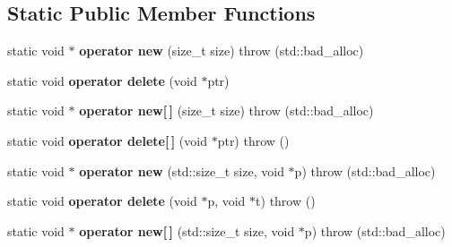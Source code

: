 \subsection*{Static Public Member Functions}
\begin{DoxyCompactItemize}
\item 
static void $\ast$ {\bfseries operator new} (size\+\_\+t size)  throw (std\+::bad\+\_\+alloc)\hypertarget{classirr_1_1core_1_1vectorSIMDf_ab1e114c88cd439043cad8062748b7481}{}\label{classirr_1_1core_1_1vectorSIMDf_ab1e114c88cd439043cad8062748b7481}

\item 
static void {\bfseries operator delete} (void $\ast$ptr)\hypertarget{classirr_1_1core_1_1vectorSIMDf_ad17be5a7cb53debd2678a2bab91448fc}{}\label{classirr_1_1core_1_1vectorSIMDf_ad17be5a7cb53debd2678a2bab91448fc}

\item 
static void $\ast$ {\bfseries operator new\mbox{[}$\,$\mbox{]}} (size\+\_\+t size)  throw (std\+::bad\+\_\+alloc)\hypertarget{classirr_1_1core_1_1vectorSIMDf_a02d924b9065ae59ade6b203a8f2c204e}{}\label{classirr_1_1core_1_1vectorSIMDf_a02d924b9065ae59ade6b203a8f2c204e}

\item 
static void {\bfseries operator delete\mbox{[}$\,$\mbox{]}} (void $\ast$ptr)  throw ()\hypertarget{classirr_1_1core_1_1vectorSIMDf_a222dc8cad9f91043b986aad1152e3eac}{}\label{classirr_1_1core_1_1vectorSIMDf_a222dc8cad9f91043b986aad1152e3eac}

\item 
static void $\ast$ {\bfseries operator new} (std\+::size\+\_\+t size, void $\ast$p)  throw (std\+::bad\+\_\+alloc)\hypertarget{classirr_1_1core_1_1vectorSIMDf_a64738dac32129a85d9de95df357bc2ec}{}\label{classirr_1_1core_1_1vectorSIMDf_a64738dac32129a85d9de95df357bc2ec}

\item 
static void {\bfseries operator delete} (void $\ast$p, void $\ast$t)  throw ()\hypertarget{classirr_1_1core_1_1vectorSIMDf_ac74ff7e143d8dfbe025df1c399c17298}{}\label{classirr_1_1core_1_1vectorSIMDf_ac74ff7e143d8dfbe025df1c399c17298}

\item 
static void $\ast$ {\bfseries operator new\mbox{[}$\,$\mbox{]}} (std\+::size\+\_\+t size, void $\ast$p)  throw (std\+::bad\+\_\+alloc)\hypertarget{classirr_1_1core_1_1vectorSIMDf_a88fcbb7888eb7f9400093baf7e763e38}{}\label{classirr_1_1core_1_1vectorSIMDf_a88fcbb7888eb7f9400093baf7e763e38}


\end{DoxyCompactItemize}
